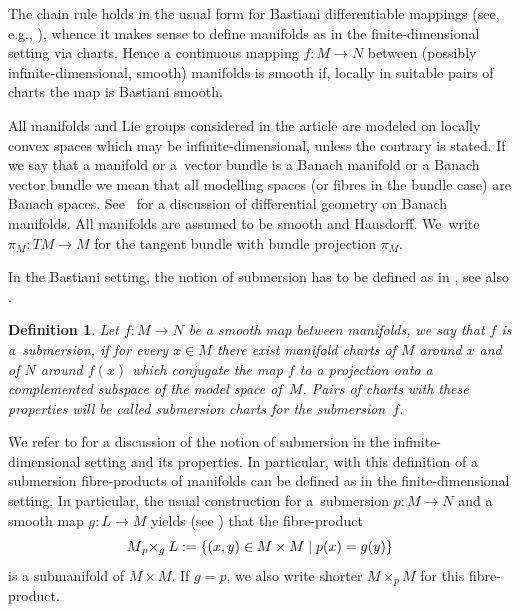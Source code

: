 \documentclass[11pt]{article}
\numberwithin{equation}{section}
\numberwithin{equation}{section}
\newtheorem{Definition}[Theorem]{Definition}
\newtheorem{setup}[Theorem]{}
\begin{document}
The chain rule holds in the usual form for Bastiani differentiable mappings (see, e.g., \cite[Proposition~1.23]{Sch23}), whence it makes sense to define manifolds as in the finite-dimensional setting via charts. Hence a continuous mapping $f \colon M \rightarrow N$ between (possibly infinite-dimensional, smooth) manifolds is smooth if, locally in suitable pairs of charts the map is Bastiani smooth.

All manifolds and Lie groups considered
in the article are modeled on locally
convex spaces which may be infinite-dimensional,
unless the contrary is stated. If we say that a manifold or a~vector bundle is a Banach manifold or a Banach vector bundle we mean that all modelling spaces (or fibres in the bundle case) are Banach spaces. See~\cite{La01} for a discussion of differential geometry on Banach manifolds. All manifolds are assumed to be smooth and Hausdorff.
We~write~$\pi_M \colon TM \rightarrow M$ for the tangent bundle with bundle projection $\pi_M$.

In the Bastiani setting, the notion of submersion has to be defined as in \cite[Definition 4.4.8]{Ham82}, see also \cite{Sch23}.

\begin{Definition}\label{defn:submersion}
Let $f \colon M \rightarrow N$ be a smooth map between manifolds, we say that $f$ is a~\emph{submersion}, if for every $x \in M$ there exist manifold charts of $M$ around $x$ and of $N$ around $f(x)$ which conjugate the map $f$ to a projection onto a complemented subspace of the model space of~$M$. Pairs of charts with these properties will be called \emph{submersion charts} for the submersion~$f$.
\end{Definition}
We refer to \cite{glo16} for a discussion of the notion of submersion in the infinite-dimensional setting and its properties.
In particular, with this definition of a submersion fibre-products of manifolds can be defined as in the finite-dimensional setting. In particular, the usual construction for a~submersion $p\colon M \rightarrow N$ and a smooth map $g\colon L \rightarrow M$ yields (see \cite[Lemma 1.60]{Sch23}) that the fibre-product
\begin{displaymath}
 M {}_{p}\hspace{-.25em}\times_{g} L := \{(x,y) \in M\times M \mid p(x)=g(y)\}
\end{displaymath}
is a submanifold of $M\times M$. If $g=p$, we also write shorter $M\times_p M$ for this fibre-product.
\end{document}
